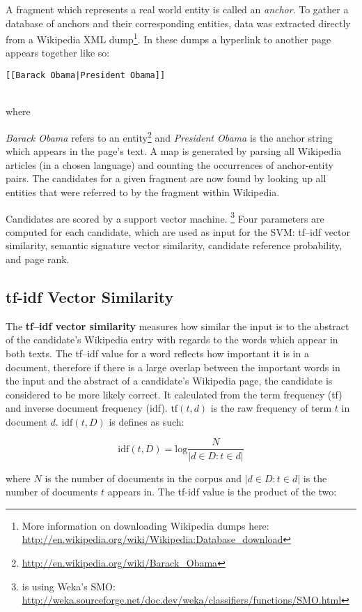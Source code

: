 \documentclass[runningheads,a4paper]{llncs}
\begin{document}
A fragment which represents a real world entity is called an \textit{anchor}. To gather a database of anchors and their corresponding entities, data was extracted directly from a Wikipedia XML dump\footnote{More information on downloading Wikipedia dumps here: \url{http://en.wikipedia.org/wiki/Wikipedia:Database_download}}. In these dumps a hyperlink to another page appears together like so:\\
\centerline{\tt{[[Barack Obama|President Obama]]}}\\
where {\textit{Barack Obama} refers to an entity\footnote{\url{http://en.wikipedia.org/wiki/Barack_Obama}} and \textit{President Obama} is the anchor string which appears in the page's text. A map is generated by parsing all Wikipedia articles (in a chosen language) and counting the occurrences of anchor-entity pairs. The candidates for a given fragment are now found by looking up all entities that were referred to by the fragment within Wikipedia. 

Candidates are scored by a support vector machine. \footnote{{\acronym} is using Weka's SMO: \url{http://weka.sourceforge.net/doc.dev/weka/classifiers/functions/SMO.html}} Four parameters are computed for each candidate, which are used as input for the SVM: tf--idf vector similarity, semantic signature vector similarity, candidate reference probability, and page rank.

\subsection{tf-idf Vector Similarity}
The \textbf{tf--idf vector similarity} measures how similar the input is to the abstract of the candidate's Wikipedia entry with regards to the words which appear in both texts. The tf--idf value for a word reflects how important it is in a document, therefore if there is a large overlap between the important words in the input and the abstract of a candidate's Wikipedia page, the candidate is considered to be more likely correct. It calculated from the term frequency (tf) and inverse document frequency (idf). $\mathrm{tf}(t, d)$ is the raw frequency of term $t$ in document $d$. $\mathrm{idf}(t, D) $ is defines as such:

$$\mathrm{idf}(t, D) = \mathrm{log}\frac{N}{|{d \in D : t \in d}|}$$

where $N$ is the number of documents in the corpus and $|{d \in D : t \in d}|$ is the number of documents $t$ appears in. The tf-idf value is the product of the two:

}
\end{document}
